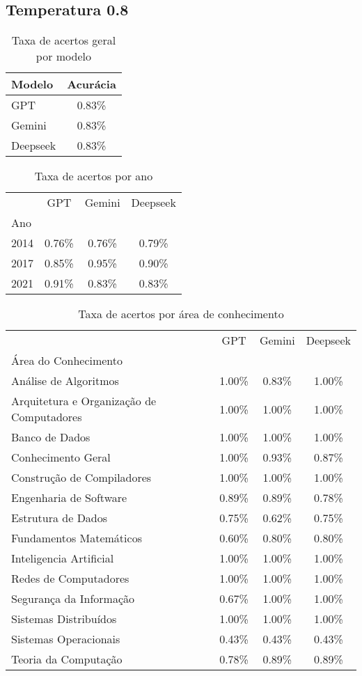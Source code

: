 \subsection{Temperatura 0.8}

\begin{table}[H]
\centering
\caption{Taxa de acertos geral por modelo}
\label{tab:acuracia_geral}
\begin{tabular}{l c}
\toprule
Modelo & Acurácia \\
\midrule
GPT & 0.83\% \\
Gemini & 0.83\% \\
Deepseek & 0.83\% \\
\bottomrule
\end{tabular}
\end{table}

\begin{table}[H]
\centering
\caption{Taxa de acertos por ano}
\label{tab:acuracia_ano}
\begin{tabular}{l c c c}
\toprule
 & GPT & Gemini & Deepseek \\
Ano &  &  &  \\
\midrule
2014 & 0.76\% & 0.76\% & 0.79\% \\
2017 & 0.85\% & 0.95\% & 0.90\% \\
2021 & 0.91\% & 0.83\% & 0.83\% \\
\bottomrule
\end{tabular}
\end{table}

\begin{table}[H]
\centering
\caption{Taxa de acertos por área de conhecimento}
\label{tab:acuracia_area}
\begin{tabular}{l c c c}
\toprule
 & GPT & Gemini & Deepseek \\
Área do Conhecimento &  &  &  \\
\midrule
Análise de Algoritmos & 1.00\% & 0.83\% & 1.00\% \\
Arquitetura e Organização de Computadores & 1.00\% & 1.00\% & 1.00\% \\
Banco de Dados & 1.00\% & 1.00\% & 1.00\% \\
Conhecimento Geral & 1.00\% & 0.93\% & 0.87\% \\
Construção de Compiladores & 1.00\% & 1.00\% & 1.00\% \\
Engenharia de Software & 0.89\% & 0.89\% & 0.78\% \\
Estrutura de Dados & 0.75\% & 0.62\% & 0.75\% \\
Fundamentos Matemáticos & 0.60\% & 0.80\% & 0.80\% \\
Inteligencia Artificial & 1.00\% & 1.00\% & 1.00\% \\
Redes de Computadores & 1.00\% & 1.00\% & 1.00\% \\
Segurança da Informação & 0.67\% & 1.00\% & 1.00\% \\
Sistemas Distribuídos & 1.00\% & 1.00\% & 1.00\% \\
Sistemas Operacionais & 0.43\% & 0.43\% & 0.43\% \\
Teoria da Computação & 0.78\% & 0.89\% & 0.89\% \\
\bottomrule
\end{tabular}
\end{table}

